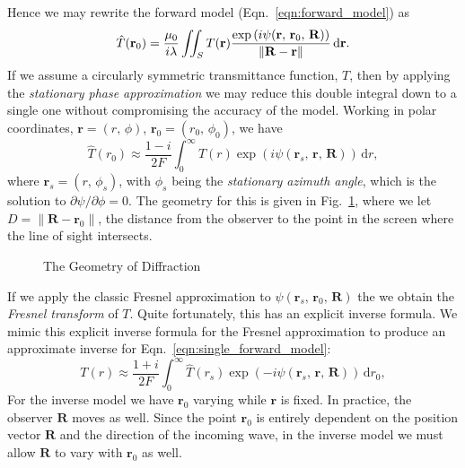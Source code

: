 \documentclass{article}
\begin{document}
    Hence we may rewrite the forward model (Eqn.~\ref{eqn:forward_model}) as
    \begin{equation}
        \label{eqn:forward_model_with_psi}
        \hat{T}(\mathbf{r}_{0})
        =
        \frac{\mu_{0}}{i\lambda}
        \iint_{S}
            T(\mathbf{r})
            \frac{%
                \exp\left(
                    i\psi(\mathbf{r},\,\mathbf{r}_{0},\,\mathbf{R})
                \right)
            }{%
                \|\mathbf{R}-\mathbf{r}\|
            }\,\textrm{d}\mathbf{r}.
    \end{equation}
    If we assume a circularly symmetric transmittance function, $T$, then
    by applying the \textit{stationary phase approximation} we may reduce this
    double integral down to a single one without compromising the accuracy of the model.
    Working in polar coordinates, $\mathbf{r}=(r,\,\phi)$,
    $\mathbf{r}_{0}=(r_{0},\,\phi_{0})$, we have
    \begin{equation}
        \label{eqn:single_forward_model}
        \hat{T}(r_{0})
        \approx
        \frac{1-i}{2F}
        \int_{0}^{\infty}
            T(r)
            \exp\left(
                i\psi(\mathbf{r}_{s},\,\mathbf{r},\,\mathbf{R})
            \right)\,\textrm{d}r,
    \end{equation}
    where $\mathbf{r}_{s}=(r,\,\phi_{s})$, with $\phi_{s}$ being the
    \textit{stationary azimuth angle}, which is the solution to
    $\partial\psi/\partial\phi=0$.
    The geometry for this is given in Fig.~\ref{fig:fig}, where we let
    $D=\|\mathbf{R}-\mathbf{r}_{0}\|$, the distance from the observer to the
    point in the screen where the line of sight intersects.
    \begin{figure}
        \centering
        \caption{The Geometry of Diffraction}
        \label{fig:fig}
    \end{figure}
    If we apply the classic Fresnel approximation to
    $\psi(\mathbf{r}_{s},\,\mathbf{r}_{0},\,\mathbf{R})$ the we obtain the
    \textit{Fresnel transform} of $T$. Quite fortunately, this has an explicit
    inverse formula. We mimic this explicit inverse formula for the Fresnel
    approximation to produce an approximate inverse for
    Eqn.~\ref{eqn:single_forward_model}:
    \begin{equation}
        \label{eqn:single_inverse_model}
        T(r)
        \approx
        \frac{1+i}{2F}
        \int_{0}^{\infty}
            \hat{T}(r_{s})
            \exp\left(
                -i\psi(\mathbf{r}_{s},\,\mathbf{r},\,\mathbf{R})
            \right)\,\textrm{d}r_{0},
    \end{equation}
    For the inverse model we have $\mathbf{r}_{0}$ varying while
    $\mathbf{r}$ is fixed. In practice, the observer $\mathbf{R}$ moves as
    well. Since the point $\mathbf{r}_{0}$ is entirely dependent on the
    position vector $\mathbf{R}$ and the direction of the incoming wave,
    in the inverse model we must allow $\mathbf{R}$ to vary with $\mathbf{r}_{0}$
    as well.
\end{document}

